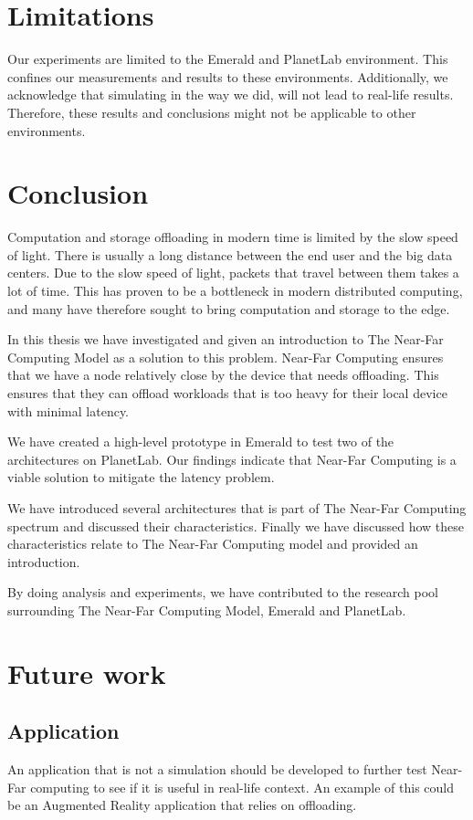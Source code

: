 \section{Limitations}
Our experiments are limited to the Emerald and PlanetLab environment. This confines our measurements and results to these environments. Additionally, we acknowledge that simulating in the way we did, will not lead to real-life results. Therefore, these results and conclusions might not be applicable to other environments.


\section{Conclusion}
Computation and storage offloading in modern time is limited by the slow speed of light. There is usually a long distance between the end user and the big data centers. Due to the slow speed of light, packets that travel between them takes a lot of time. This has proven to be a bottleneck in modern distributed computing, and many have therefore sought to bring computation and storage to the edge. 

In this thesis we have investigated and given an introduction to The Near-Far Computing Model as a solution to this problem. Near-Far Computing ensures that we have a node relatively close by the device that needs offloading. This ensures that they can offload workloads that is too heavy for their local device with minimal latency. 

We have created a high-level prototype in Emerald to test two of the architectures on PlanetLab. Our findings indicate that Near-Far Computing is a viable solution to mitigate the latency problem. 

We have introduced several architectures that is part of The Near-Far Computing spectrum and discussed their characteristics. Finally we have discussed how these characteristics relate to The Near-Far Computing model and provided an introduction.

By doing analysis and experiments, we have contributed to the research pool surrounding The Near-Far Computing Model, Emerald and PlanetLab.



\section{Future work}
\subsection{Application}
An application that is not a simulation should be developed to further test Near-Far computing to see if it is useful in real-life context. An example of this could be an Augmented Reality application that relies on offloading. 

